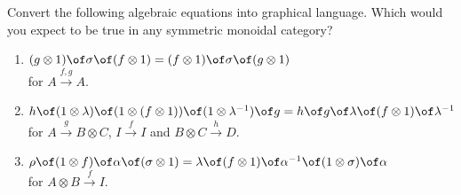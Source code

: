 \begin{exercise}
  Convert the following algebraic equations into graphical language.
  Which would you expect to be true in any symmetric monoidal category?
  \begin{enumerate}
    \item
      $(g \otimes 1) \of \sigma \of (f \otimes 1)
        = (f \otimes 1) \of \sigma \of (g \otimes 1)$ \\
      for $A \xrightarrow{f, g} A$.

    \item
      $h \of (1 \otimes \lambda) \of (1 \otimes (f \otimes 1)) \of (1 \otimes \lambda^{-1}) \of g
        = h \of g \of \lambda \of (f \otimes 1) \of \lambda^{-1}$ \\
      for $A \xrightarrow{g} B \otimes C$, $I \xrightarrow{f} I$ and $B \otimes C \xrightarrow{h} D$.

    \item
      $\rho \of (1 \otimes f) \of \alpha \of (\sigma \otimes 1)
        = \lambda \of (f \otimes 1) \of \alpha^{-1} \of (1 \otimes \sigma) \of \alpha$ \\
      for $A \otimes B \xrightarrow{f} I$.
  \end{enumerate}
\end{exercise}

